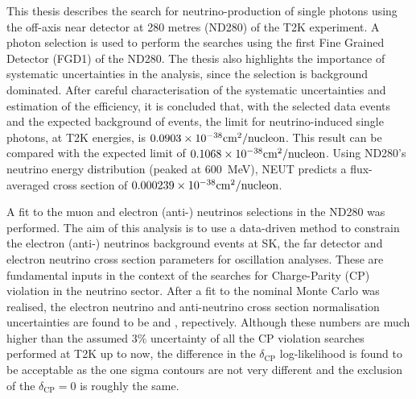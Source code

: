 
This thesis describes the search for neutrino-production of single
photons using the off-axis near detector at 280 metres (ND280) of the
T2K experiment. A photon selection is used to perform the searches
using the first Fine Grained Detector (FGD1) of the ND280. The thesis
also highlights the importance of systematic uncertainties in the
analysis, since the selection is background dominated. After careful
characterisation of the systematic uncertainties and estimation of the
efficiency, it is concluded that, with the selected \ndataevents data
events and the expected background of \nbkgevents events, the limit
for neutrino-induced single photons, at T2K energies, is
$0.0903 \times 10^{-38} \text{cm}^{2} / \text{nucleon}$. This result can be compared with the expected limit of
$0.1068 \times 10^{-38} \text{cm}^{2} / \text{nucleon}$. Using ND280’s neutrino energy distribution (peaked at
600~MeV), NEUT predicts a flux-averaged cross section of $0.000239 \times 10^{-38} \text{cm}^{2} / \text{nucleon}$.

A fit to the muon and electron (anti-) neutrinos selections in the
ND280 was performed. The aim of this analysis is to use a data-driven
method to constrain the electron (anti-) neutrinos background events
at SK, the far detector and electron neutrino cross section parameters
for oscillation analyses. These are fundamental inputs in the context
of the searches for Charge-Parity (CP) violation in the neutrino
sector. After a fit to the nominal Monte Carlo was realised, the
electron neutrino and anti-neutrino cross section normalisation
uncertainties are found to be \electronnuerr and \electronanuerr,
repectively. Although these numbers are much higher than the assumed
$3\%$ uncertainty of all the CP violation searches performed at T2K up
to now, the difference in the $\delta_{\text{CP}}$ log-likelihood is
found to be acceptable as the one sigma contours are not very
different and the exclusion of the $\delta_\text{CP} = 0$ is roughly
the same.



